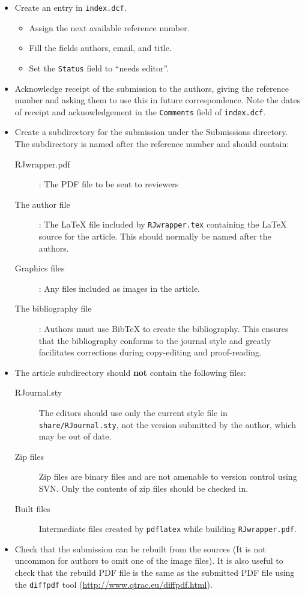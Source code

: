 \documentclass[11pt]{article}
\begin{document}
\begin{itemize}
\item Create an entry in \texttt{index.dcf}.
  \begin{itemize}
  \item Assign the next available reference number.
  \item Fill the  fields authors, email, and title.
  \item Set the \texttt{Status} field to ``needs editor''.
  \end{itemize}
\item Acknowledge receipt of the submission to the authors, giving the
  reference number and asking them to use this in future
  correspondence.  Note the dates of receipt and acknowledgement in
  the \texttt{Comments} field of \texttt{index.dcf}.
\item Create a subdirectory for the submission under the Submissions
  directory.  The subdirectory is named after the reference number and
  should contain:
  \begin{description}
  \item[RJwrapper.pdf]: The PDF file to be sent to reviewers
  \item[The author file]: The LaTeX file included by \texttt{RJwrapper.tex}
    containing the LaTeX source for the article. This should normally
    be named after the authors.
  \item[Graphics files]: Any files included as images in the article.
  \item[The bibliography file]: Authors must use BibTeX to create the
    bibliography. This ensures that the bibliography conforms to the 
    journal style and greatly facilitates corrections during copy-editing
    and proof-reading.
  \end{description}
\item The article subdirectory should {\bf not} contain the following files:
  \begin{description}
  \item[RJournal.sty] The editors should use only the current style
    file in \texttt{share/RJournal.sty}, not the version submitted by
    the author, which may be out of date.
  \item[Zip files] Zip files are binary files and are not amenable to
    version control using SVN. Only the contents of zip files should
    be checked in.
  \item[Built files] Intermediate files created by \texttt{pdflatex}
    while building \texttt{RJwrapper.pdf}.
  \end{description}
\item Check that the submission can be rebuilt from the sources (It is
  not uncommon for authors to omit one of the image files). It is also
  useful to check that the rebuild PDF file is the same as the
  submitted PDF file using the \texttt{diffpdf} tool
  (\url{http://www.qtrac.eu/diffpdf.html}).
\end{itemize}
\end{document}
